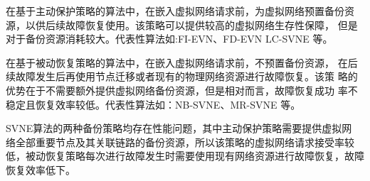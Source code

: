 在基于主动保护策略的算法中，在嵌入虚拟网络请求前，为虚拟网络预置备份资源，以供后续故障恢复使用。该策略可以提供较高的虚拟网络生存性保障， 但是对于备份资源消耗较大。代表性算法如:FI-EVN\cite{yu2011cost}、FD-EVN\cite{wang2014survivable} LC-SVNE\cite{hu2012location} 等。

在基于被动恢复策略的算法中，在嵌入虚拟网络请求前，不预置备份资源， 在后续故障发生后再使用节点迁移或者现有的物理网络资源进行故障恢复。该策 略的优势在于不需要额外提供虚拟网络备份资源，但是相对而言，故障恢复成功 率不稳定且恢复效率较低。代表性算法如：NB-SVNE\cite{bo2014dynamic}、MR-SVNE\cite{qiang2014heuristic} 等。

SVNE算法的两种备份策略均存在性能问题，其中主动保护策略需要提供虚拟网 络全部重要节点及其关联链路的备份资源，所以该策略的虚拟网络请求接受率较 低，被动恢复策略每次进行故障发生时需要使用现有网络资源进行故障恢复，故障恢复效率低下。

